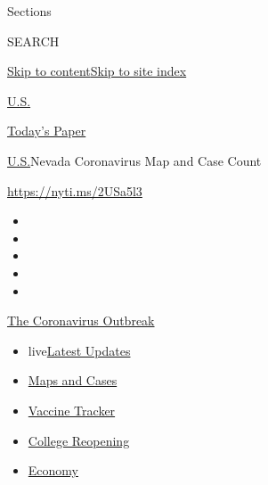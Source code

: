 Sections

SEARCH

\protect\hyperlink{site-content}{Skip to
content}\protect\hyperlink{site-index}{Skip to site index}

\href{https://www.nytimes.com/section/us}{U.S.}

\href{https://myaccount.nytimes.com/auth/login?response_type=cookie\&client_id=vi}{}

\href{https://www.nytimes.com/section/todayspaper}{Today's Paper}

\href{/section/us}{U.S.}\textbar{}Nevada Coronavirus Map and Case Count

\url{https://nyti.ms/2USa5l3}

\begin{itemize}
\item
\item
\item
\item
\item
\end{itemize}

\href{https://www.nytimes.com/news-event/coronavirus?action=click\&pgtype=Article\&state=default\&region=TOP_BANNER\&context=storylines_menu}{The
Coronavirus Outbreak}

\begin{itemize}
\tightlist
\item
  live\href{https://www.nytimes.com/2020/08/04/world/coronavirus-cases.html?action=click\&pgtype=Article\&state=default\&region=TOP_BANNER\&context=storylines_menu}{Latest
  Updates}
\item
  \href{https://www.nytimes.com/interactive/2020/us/coronavirus-us-cases.html?action=click\&pgtype=Article\&state=default\&region=TOP_BANNER\&context=storylines_menu}{Maps
  and Cases}
\item
  \href{https://www.nytimes.com/interactive/2020/science/coronavirus-vaccine-tracker.html?action=click\&pgtype=Article\&state=default\&region=TOP_BANNER\&context=storylines_menu}{Vaccine
  Tracker}
\item
  \href{https://www.nytimes.com/2020/08/02/us/covid-college-reopening.html?action=click\&pgtype=Article\&state=default\&region=TOP_BANNER\&context=storylines_menu}{College
  Reopening}
\item
  \href{https://www.nytimes.com/live/2020/08/04/business/stock-market-today-coronavirus?action=click\&pgtype=Article\&state=default\&region=TOP_BANNER\&context=storylines_menu}{Economy}
\end{itemize}


